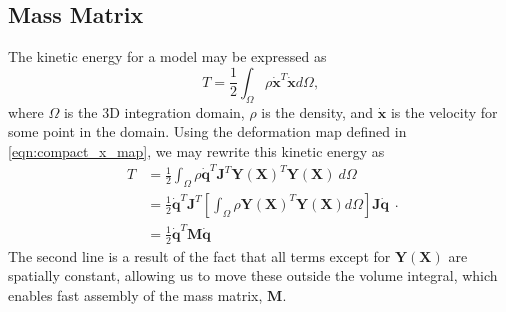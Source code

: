 \subsection{Mass Matrix}
The kinetic energy for a model may be expressed as
\begin{equation}
T = \frac{1}{2}\int_{ \Omega} \rho \dot{\mathbf{x}}^T\dot{\mathbf{x}} d\Omega
\text{,}
\end{equation}
where $\Omega$ is the 3D integration domain, $\rho$ is the density, and $\dot{\mathbf{x}}$ is the velocity for some point in the domain. Using the deformation map defined in \ref{eqn:compact_x_map}, we may rewrite this kinetic energy as
\begin{equation}
\begin{split}
T & = \frac{1}{2}\int_{ \Omega} \rho \dot{\mathbf{q}}^T \mathbf{J}^T\mathbf{Y(X)}^T\mathbf{Y(X)}\ d\Omega \\
  & = \frac{1}{2} \dot{\mathbf{q}}^T \mathbf{J}^T \left[ \int_{ \Omega} \rho \mathbf{Y(X)}^T\mathbf{Y(X)} d\Omega \right] \mathbf{J}\dot{\mathbf{q}} \\
  & = \frac{1}{2} \dot{\mathbf{q}}^T \mathbf{M} \dot{\mathbf{q}}
\end{split}
\text{.}
\end{equation}
The second line is a result of the fact that all terms except for $\mathbf{Y(X)}$ are spatially constant, allowing us to move these outside the volume integral, which enables fast assembly of the mass matrix, $\mathbf{M}$.

